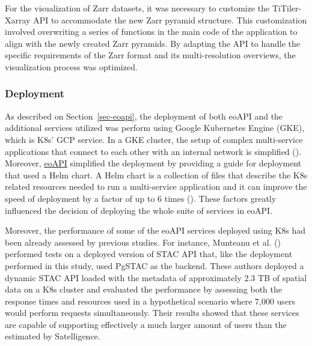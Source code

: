 \documentclass[
  oneside,
  open=any]{scrbook}
\begin{document}
For the visualization of Zarr datasets, it was necessary to customize
the TiTiler-Xarray API to accommodate the new Zarr pyramid structure.
This customization involved overwriting a series of functions in the
main code of the application to align with the newly created Zarr
pyramids. By adapting the API to handle the specific requirements of the
Zarr format and its multi-resolution overviews, the visualization
process was optimized.

\subsubsection*{Deployment}\label{deployment}

As described on Section~\ref{sec-eoapi}, the deployment of both eoAPI
and the additional services utilized was perform using Google Kubernetes
Engine (GKE), which is K8s' GCP service. In a GKE cluster, the setup of
complex multi-service applications that connect to each other with an
internal network is simplified
(). Moreover,
\href{www.eoapi.dev}{eoAPI} simplified the deployment by providing a
guide for deployment that used a Helm chart. A Helm chart is a
collection of files that describe the K8s related resources needed to
run a multi-service application and it can improve the speed of
deployment by a factor of up to 6 times
(). These
factors greatly influenced the decision of deploying the whole suite of
services in eoAPI.

Moreover, the performance of some of the eoAPI services deployed using
K8s had been already assessed by previous studies. For instance,
Munteanu et al. ()
performed tests on a deployed version of STAC API that, like the
deployment performed in this study, used PgSTAC as the backend. These
authors deployed a dynamic STAC API loaded with the metadata of
approximately 2.3 TB of spatial data on a K8s cluster and evaluated the
performance by assessing both the response times and resources used in a
hypothetical scenario where 7,000 users would perform requests
simultaneously. Their results showed that these services are capable of
supporting effectively a much larger amount of users than the estimated
by Satelligence.
\end{document}
